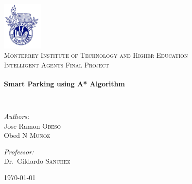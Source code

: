 \begin{titlepage}

\begin{center}

\includegraphics[width=0.15\textwidth]{./logo}~\\[1cm]

\textsc{\LARGE Monterrey Institute of Technology and Higher Education}\\[1.5cm]

\textsc{\Large Intelligent Agents Final Project}\\[0.5cm]

\HRule \\[0.4cm]
{ \huge \bfseries Smart Parking using A* Algorithm \\[0.4cm] }

\HRule \\[1.5cm]

\begin{minipage}{0.4\textwidth}
\begin{flushleft} \large
\emph{Authors:}\\
Jose Ramon \textsc{Obeso}\\
Obed N \textsc{Muñoz}
\end{flushleft}
\end{minipage}
\begin{minipage}{0.4\textwidth}
\begin{flushright} \large
\emph{Professor:} \\
Dr.~Gildardo \textsc{Sanchez}
\end{flushright}
\end{minipage}

\vfill

{\large \today}

\end{center}
\end{titlepage}
